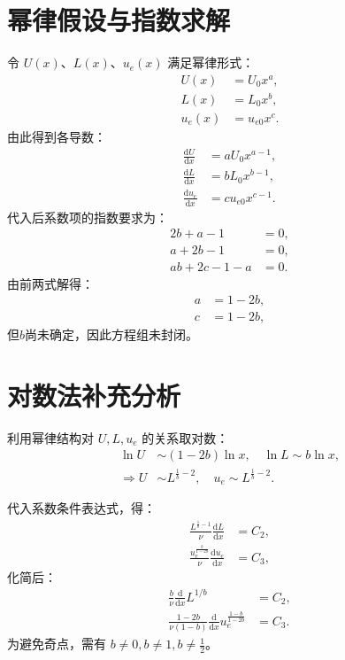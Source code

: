 \section{幂律假设与指数求解}
令 $U(x)$、$L(x)$、$u_e(x)$ 满足幂律形式：
\begin{align}
    U(x) &= U_0 x^{a}, \\
    L(x) &= L_0 x^{b}, \\
    u_e(x) &= u_{e0} x^{c}.
\end{align}
由此得到各导数：
\begin{align}
    \frac{\mathrm{d}U}{\mathrm{d}x} &= a U_0 x^{a-1}, \\
    \frac{\mathrm{d}L}{\mathrm{d}x} &= b L_0 x^{b-1}, \\
    \frac{\mathrm{d}u_e}{\mathrm{d}x} &= c u_{e0} x^{c-1}.
\end{align}
代入后系数项的指数要求为：
\begin{align}
    2b + a - 1 &= 0, \\
    a + 2b - 1 &= 0, \\
    ab + 2c - 1 - a &= 0.
\end{align}
由前两式解得：
\begin{align}
    a &= 1 - 2b, \\
    c &= 1 - 2b,
\end{align}
但$b$尚未确定，因此方程组未封闭。

\section{对数法补充分析}
利用幂律结构对 $U, L, u_e$ 的关系取对数：
\begin{align}
    \ln U &\sim (1 - 2b) \ln x, \quad 
    \ln L \sim b \ln x, \\
    \Rightarrow U &\sim L^{\frac{1}{b} - 2}, \quad 
    u_e \sim L^{\frac{1}{b} - 2}.
\end{align}

代入系数条件表达式，得：
\begin{align}
    \frac{L^{\frac{1}{b}-1}}{\nu} \frac{\mathrm{d}L}{\mathrm{d}x} &= C_2, \\
    \frac{u_e^{\frac{b}{1-2b}}}{\nu} \frac{\mathrm{d}u_e}{\mathrm{d}x} &= C_3,
\end{align}
化简后：
\begin{align}
    \frac{b}{\nu} \frac{\mathrm{d}}{\mathrm{d}x} L^{1/b} &= C_2, \\
    \frac{1-2b}{\nu(1-b)} \frac{\mathrm{d}}{\mathrm{d}x} u_e^{\frac{1-b}{1-2b}} &= C_3.
\end{align}
为避免奇点，需有 $b \ne 0, b \ne 1, b \ne \frac{1}{2}$。

